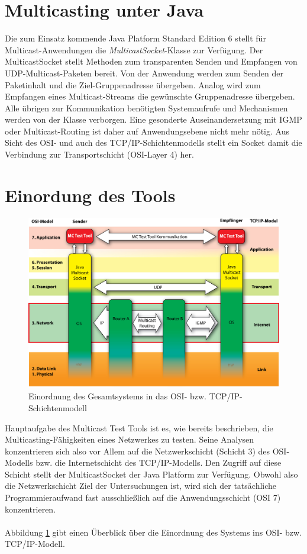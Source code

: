 \section{Multicasting unter Java}

Die zum Einsatz kommende Java Platform Standard Edition 6 stellt für
Multicast-Anwendungen die \emph{MulticastSocket}-Klasse zur Verfügung. Der
MulticastSocket stellt Methoden zum transparenten Senden und Empfangen von
UDP-Multicast-Paketen bereit. Von der Anwendung werden zum Senden der
Paketinhalt und die Ziel-Gruppenadresse übergeben. Analog wird zum
Empfangen eines Multicast-Streams die gewünschte Gruppenadresse übergeben. Alle
übrigen zur Kommunikation benötigten Systemaufrufe und Mechanismen werden von
der Klasse verborgen. Eine gesonderte Auseinandersetzung mit IGMP oder
Multicast-Routing ist daher auf Anwendungsebene nicht mehr nötig. Aus Sicht des
OSI- und auch des TCP/IP-Schichtenmodells stellt ein Socket damit die Verbindung
zur Transportschicht (OSI-Layer 4) her.

\section{Einordung des Tools}

\begin{figure}[H]
\includegraphics[width=15cm]{images/mc_osi_einordnung.jpg}
\centering
\caption{Einordnung des Gesamtsystems in das OSI- bzw. TCP/IP-Schichtenmodell}
\label{mc_osi_einordnung}
\end{figure}

Hauptaufgabe des Multicast Test Tools ist es, wie bereits beschrieben, die
Multicasting-Fähigkeiten eines Netzwerkes zu testen. Seine Analysen
konzentrieren sich also vor Allem auf die Netzwerkschicht (Schicht 3) des
OSI-Modells bzw. die Internetschicht des TCP/IP-Modells. Den Zugriff auf diese
Schicht stellt der MulticastSocket der Java Platform zur Verfügung. Obwohl also
die Netzwerkschicht Ziel der Untersuchungen ist, wird sich der tatsächliche
Programmieraufwand fast ausschließlich auf die Anwendungsschicht (OSI 7)
konzentrieren.\\
\\
Abbildung \ref{mc_osi_einordnung} gibt einen Überblick über die Einordnung des
Systems ins OSI- bzw. TCP/IP-Modell.
